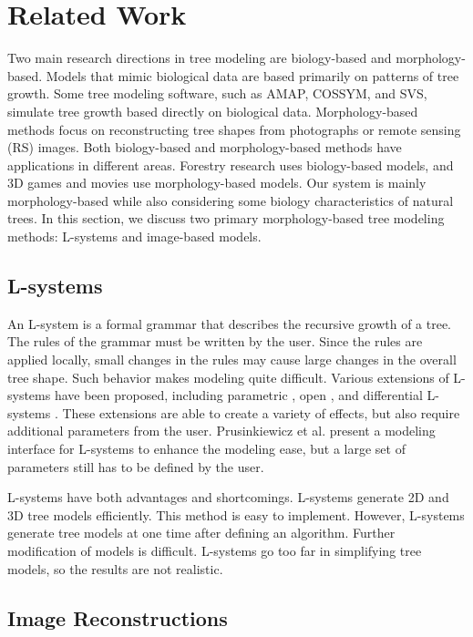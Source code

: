 \section{Related Work} 

Two main research directions in tree modeling are biology-based and morphology-based. Models that mimic biological data are based primarily on patterns of tree growth. Some tree modeling software, such as AMAP, COSSYM, and SVS, simulate tree growth based directly on biological data.  Morphology-based methods focus on reconstructing tree shapes from photographs or remote sensing (RS) images. Both biology-based and morphology-based methods have applications in different areas. Forestry research uses biology-based models, and 3D games and movies use morphology-based models.  Our system is mainly morphology-based while also considering some biology characteristics of natural trees. In this section, we discuss two primary morphology-based tree modeling methods: L-systems and image-based models.

\subsection{L-systems}

An L-system is a formal grammar that describes the recursive growth of a tree.  The rules of the grammar must be written by the user. Since the rules are applied locally, small changes in the rules may cause large changes in the overall tree shape. Such behavior makes modeling quite difficult. Various extensions of L-systems have been proposed, including parametric \cite{Prusinkiewicz:sv90}, open \cite{Mech:SIGGRAPH96}, and differential L-systems \cite{prusinkiewicz:siggraph93}. These extensions are able to create a variety of effects, but also require additional parameters from the user. Prusinkiewicz et al. \cite{Prusinkiewicz:2001} present a modeling interface for L-systems to enhance the modeling ease, but a large set of parameters still has to be defined by the user.

L-systems have both advantages and shortcomings. L-systems generate 2D and 3D tree models efficiently. This method is easy to implement. However, L-systems generate tree models at one time after defining an algorithm. Further modification of models is difficult. L-systems go too far in simplifying tree models, so the results are not realistic. 

\subsection{Image Reconstructions}

